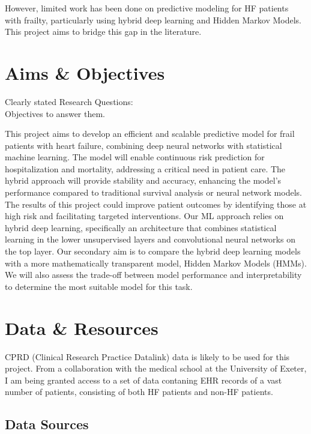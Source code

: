 \documentclass[%
 reprint,
 amsmath,amssymb,
 aps,
 nofootinbib
]{revtex4-2}
\theoremstyle{definition}
\begin{document}
However, limited work has been done on predictive modeling for HF patients with frailty, particularly using hybrid deep learning and Hidden Markov Models. This project aims to bridge this gap in the literature.\\

\section{\label{aimsobj}Aims \& Objectives}
Clearly stated Research Questions:\\
Objectives to answer them.

This project aims to develop an efficient and scalable predictive model for frail patients with heart failure, combining deep neural networks with statistical machine learning. The model will enable continuous risk prediction for hospitalization and mortality, addressing a critical need in patient care. The hybrid approach will provide stability and accuracy, enhancing the model's performance compared to traditional survival analysis or neural network models. The results of this project could improve patient outcomes by identifying those at high risk and facilitating targeted interventions. Our ML approach relies on hybrid deep learning, specifically an architecture that combines statistical learning in the lower unsupervised layers and convolutional neural networks on the top layer. Our secondary aim is to compare the hybrid deep learning models with a more mathematically transparent model, Hidden Markov Models (HMMs). We will also assess the trade-off between model performance and interpretability to determine the most suitable model for this task.

\section{\label{datares}Data \& Resources}
CPRD (Clinical Research Practice Datalink) data is likely to be used for this project. From a collaboration with the medical school at the University of Exeter, I am being granted access to a set of data contaning EHR records of a vast number of patients, consisting of both HF patients and non-HF patients.

\subsection{\label{data}Data Sources}
\end{document}
